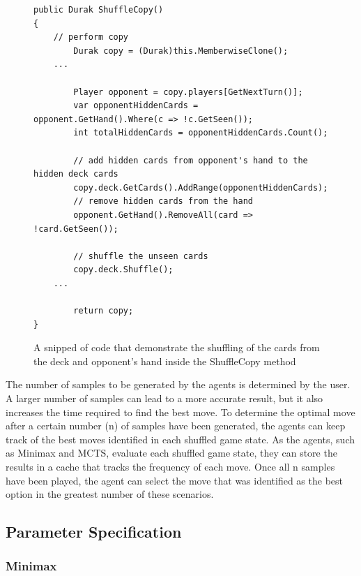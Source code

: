 \begin{figure}[h]
\captionsetup{justification=centering}
\begin{lstlisting}
public Durak ShuffleCopy()
{
	// perform copy
    	Durak copy = (Durak)this.MemberwiseClone();
	...
	
    	Player opponent = copy.players[GetNextTurn()];
    	var opponentHiddenCards = opponent.GetHand().Where(c => !c.GetSeen());
    	int totalHiddenCards = opponentHiddenCards.Count();

    	// add hidden cards from opponent's hand to the hidden deck cards
    	copy.deck.GetCards().AddRange(opponentHiddenCards);
    	// remove hidden cards from the hand
    	opponent.GetHand().RemoveAll(card => !card.GetSeen());

    	// shuffle the unseen cards 
    	copy.deck.Shuffle();
	...
	
    	return copy;
}
\end{lstlisting}
\caption{A snipped of code that demonstrate the shuffling of the cards from the deck and opponent's hand inside the ShuffleCopy method}
\label{fig:shuffleCopy}
\end{figure}

The number of samples to be generated by the agents is determined by the user. A larger number of samples can lead to a more accurate result, but it also increases the time required to find the best move. To determine the optimal move after a certain number (n) of samples have been generated, the agents can keep track of the best moves identified in each shuffled game state. As the agents, such as Minimax and MCTS, evaluate each shuffled game state, they can store the results in a cache that tracks the frequency of each move. Once all n samples have been played, the agent can select the move that was identified as the best option in the greatest number of these scenarios.

\subsection{Parameter Specification}
\label{paramSpecification}

\subsubsection{Minimax}

